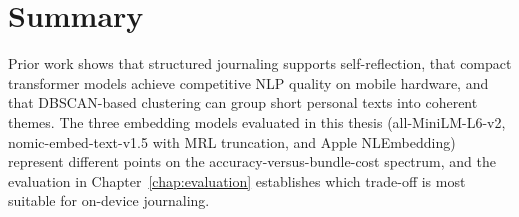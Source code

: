 \section{Summary}

Prior work shows that structured journaling supports self-reflection, that compact transformer models achieve competitive NLP quality on mobile hardware, and that DBSCAN-based clustering can group short personal texts into coherent themes. The three embedding models evaluated in this thesis (all-MiniLM-L6-v2, nomic-embed-text-v1.5 with MRL truncation, and Apple NLEmbedding) represent different points on the accuracy-versus-bundle-cost spectrum, and the evaluation in Chapter~\ref{chap:evaluation} establishes which trade-off is most suitable for on-device journaling.
